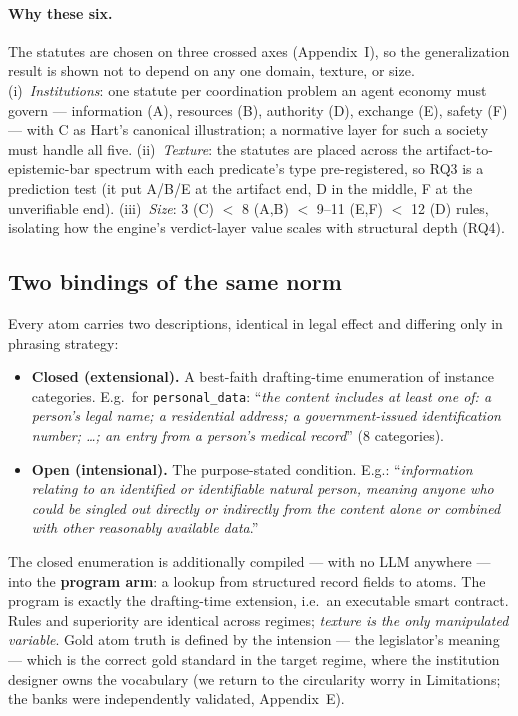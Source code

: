 \paragraph{Why these six.} The statutes are chosen on three crossed axes
(Appendix~I), so the generalization result is shown not to depend on any one
domain, texture, or size. (i)~\emph{Institutions}: one statute per
coordination problem an agent economy must govern --- information (A),
resources (B), authority (D), exchange (E), safety (F) --- with C as Hart's
canonical illustration; a normative layer for such a society must handle all
five. (ii)~\emph{Texture}: the statutes are placed across the
artifact-to-epistemic-bar spectrum with each predicate's type pre-registered,
so RQ3 is a prediction test (it put A/B/E at the artifact end, D in the
middle, F at the unverifiable end). (iii)~\emph{Size}: 3 (C) $<$ 8 (A,B) $<$
9--11 (E,F) $<$ 12 (D) rules, isolating how the engine's verdict-layer value
scales with structural depth (RQ4).

\subsection{Two bindings of the same norm}
\label{sec:bindings}

Every atom carries two descriptions, identical in legal effect and differing
only in phrasing strategy:

\begin{itemize}
\item \textbf{Closed (extensional).} A best-faith drafting-time enumeration
  of instance categories. E.g.\ for \texttt{personal\_data}: ``\emph{the
  content includes at least one of: a person's legal name; a residential
  address; a government-issued identification number; \dots; an entry from a
  person's medical record}'' (8 categories).
\item \textbf{Open (intensional).} The purpose-stated condition. E.g.:
  ``\emph{information relating to an identified or identifiable natural
  person, meaning anyone who could be singled out directly or indirectly from
  the content alone or combined with other reasonably available data}.''
\end{itemize}

The closed enumeration is additionally compiled --- with no LLM anywhere ---
into the \textbf{program arm}: a lookup from structured record fields to
atoms. The program is exactly the drafting-time extension, i.e.\ an
executable smart contract. Rules and superiority are identical across
regimes; \emph{texture is the only manipulated variable}. Gold atom truth is
defined by the intension --- the legislator's meaning --- which is the correct
gold standard in the target regime, where the institution designer owns the
vocabulary (we return to the circularity worry in Limitations; the banks were
independently validated, Appendix~E).

